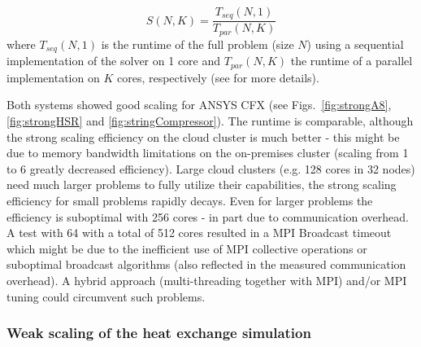 \documentclass[3p,times]{elsarticle}
\begin{document}
\begin{equation}
\label{eq:speedup}
S(N,K) = \frac{T_{seq}(N,1)}{T_{par}(N,K)}
\end{equation}
where $T_{seq}(N,1)$ is the runtime of the full problem (size $N$) using a sequential implementation of the solver on 1 core and $T_{par}(N,K)$ the runtime of a parallel implementation on $K$ cores, respectively (see \cite{kaminsky15} for more details).

Both systems showed good scaling for ANSYS CFX (see Figs.~\ref{fig:strongA8}, \ref{fig:strongHSR} and \ref{fig:stringCompressor}). The runtime is comparable, although the strong scaling efficiency on the cloud cluster is much better - this might be due to memory bandwidth limitations on the on-premises cluster (scaling from 1 to 6 greatly decreased efficiency).  Large cloud clusters (e.g. 128 cores in 32 nodes) need much larger problems to fully utilize their capabilities, the strong scaling efficiency for small problems rapidly decays. Even for larger problems the efficiency is suboptimal with 256 cores - in part due to communication overhead. \\
A test with 64 with a total of 512 cores resulted in a MPI Broadcast timeout which might be due to the inefficient use of MPI collective operations or suboptimal broadcast algorithms (also reflected in the measured communication overhead). A hybrid approach (multi-threading together with MPI) and/or MPI tuning could circumvent such problems.

 
\subsubsection{Weak scaling of the heat exchange simulation}
\end{document}
